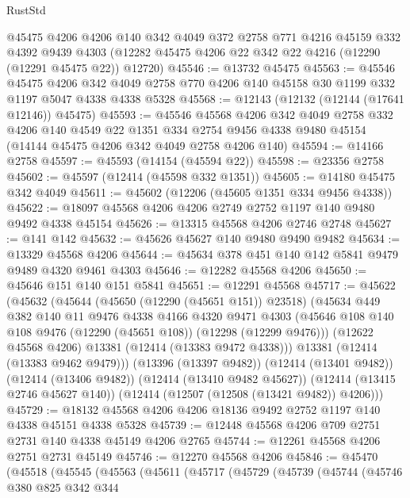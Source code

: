 \begin{lexlean}{RustStd}
\begin{coremodule}
{\begin{coremodule}
{{{{{{{{{{{{{{{{{{{{{{{{{{{{{{{{{{{{{{{{{{{{{{{{{{    @45475
    @4206
    @4206
    @140
    @342
    @4049
    @372
    @2758
    @771
    @4216
    @45159
    @332
    @4392
    @9439
    @4303
    (@12282 @45475 @4206 @22 @342 @22 @4216 (@12290 (@12291 @45475 @22)) @12720)
@45546 := @13732 @45475
@45563 := @45546
    @45475
    @4206
    @342
    @4049
    @2758
    @770
    @4206
    @140
    @45158
    @30
    @1199
    @332
    @1197
    @5047
    @4338
    @4338
    @5328
@45568 := @12143 (@12132 (@12144 (@17641 @12146)) @45475)
@45593 := @45546
    @45568
    @4206
    @342
    @4049
    @2758
    @332
    @4206
    @140
    @4549
    @22
    @1351
    @334
    @2754
    @9456
    @4338
    @9480
    @45154
    (@14144 @45475 @4206 @342 @4049 @2758 @4206 @140)
@45594 := @14166 @2758
@45597 := @45593 (@14154 (@45594 @22))
@45598 := @23356 @2758
@45602 := @45597 (@12414 (@45598 @332 @1351))
@45605 := @14180 @45475 @342 @4049
@45611 := @45602 (@12206 (@45605 @1351 @334 @9456 @4338))
@45622 := @18097 @45568 @4206 @4206 @2749 @2752 @1197 @140 @9480 @9492 @4338 @45154
@45626 := @13315 @45568 @4206 @2746 @2748
@45627 := @141 @142
@45632 := @45626 @45627 @140 @9480 @9490 @9482
@45634 := @13329 @45568 @4206
@45644 := @45634 @378 @451 @140 @142 @5841 @9479 @9489 @4320 @9461 @4303
@45646 := @12282 @45568 @4206
@45650 := @45646 @151 @140 @151 @5841
@45651 := @12291 @45568
@45717 := @45622
    (@45632
      (@45644
        (@45650 (@12290 (@45651 @151)) @23518)
        (@45634
          @449
          @382
          @140
          @11
          @9476
          @4338
          @4166
          @4320
          @9471
          @4303
          (@45646 @108 @140 @108 @9476 (@12290 (@45651 @108)) (@12298 (@12299 @9476)))
          (@12622 @45568 @4206)
          @13381
          (@12414 (@13383 @9472 @4338)))
        @13381
        (@12414 (@13383 @9462 @9479)))
      (@13396 (@13397 @9482))
      (@12414 (@13401 @9482))
      (@12414 (@13406 @9482))
      (@12414 (@13410 @9482 @45627))
      (@12414 (@13415 @2746 @45627 @140))
      (@12414 (@12507 (@12508 (@13421 @9482)) @4206)))
@45729 := @18132 @45568 @4206 @4206 @18136 @9492 @2752 @1197 @140 @4338 @45151 @4338 @5328
@45739 := @12448 @45568 @4206 @709 @2751 @2731 @140 @4338 @45149 @4206 @2765
@45744 := @12261 @45568 @4206 @2751 @2731 @45149
@45746 := @12270 @45568 @4206
@45846 := @45470
    (@45518
      (@45545
        (@45563
          (@45611
            (@45717
              (@45729
                (@45739
                  (@45744
                    (@45746
                      @380
                      @825
                      @342
                      @344
}}}}}}}}}}}}}}}}}}}}}}}}}}}}}}}}}}}}}}}}}}}}}}}}}}
\end{coremodule}}
\end{coremodule}
\end{lexlean}
